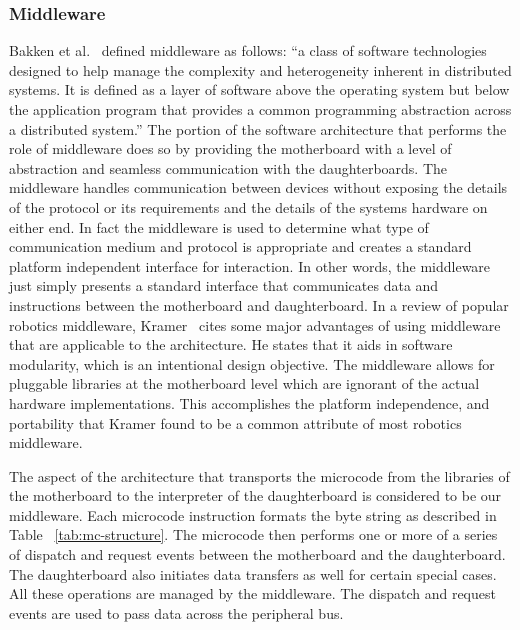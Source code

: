 	\subsubsection{Middleware} %
	\label{ssub:middleware}
	Bakken et al.~\parencite{bakken2001middleware} defined middleware as follows: ``a class of software technologies designed to help manage the complexity and heterogeneity inherent in distributed systems. It is defined as a layer of software above the operating system but below the application program that provides a common programming abstraction across a distributed system.'' The portion of the \xten software architecture that performs the role of middleware does so by providing the motherboard with a level of abstraction and seamless communication with the daughterboards. The middleware handles communication between devices without exposing the details of the protocol or its requirements and the details of the systems hardware on either end. In fact the middleware is used to determine what type of communication medium and protocol is appropriate and creates a standard platform independent interface for interaction. In other words, the middleware just simply presents a standard interface that communicates data and instructions between the motherboard and daughterboard.
	In a review of popular robotics middleware, Kramer~\parencite{kramer} cites some major advantages of using middleware that are applicable to the \xten architecture. He states that it aids in software modularity, which is an intentional design objective. The middleware allows for pluggable libraries at the motherboard level which are ignorant of the actual hardware implementations. This accomplishes the platform independence, and portability that Kramer found to be a common attribute of most robotics middleware.
	
	The aspect of the \xten architecture that transports the microcode from the libraries of the motherboard to the interpreter of the daughterboard is considered to be our middleware. Each microcode instruction formats the byte string as described in Table ~\ref{tab:mc-structure}. The microcode then performs one or more of a series of dispatch and request events between the motherboard and the daughterboard. The daughterboard also initiates data transfers as well for certain special cases. All these operations are managed by the middleware. The dispatch and request events are used to pass data across the peripheral bus.


	
